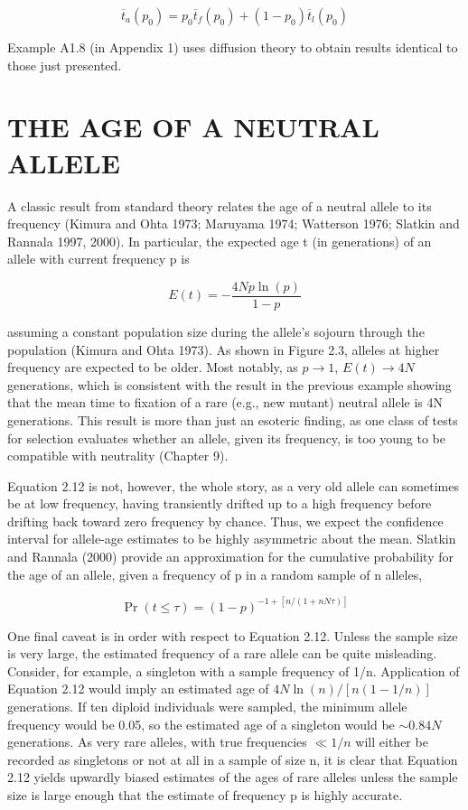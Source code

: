 \documentclass{article}
\begin{document}
\begin{equation}
\overline{t}_{a}(p_{0})=p_{0}\overline{t}_{f}(p_{0})+(1-p_{0})\overline{t}_{l}(p_{0})
\tag{2.11d}
\label{eq:2_11d}
\end{equation}

Example A1.8 (in Appendix 1) uses diffusion theory to obtain results identical to those just presented.

\section{THE AGE OF A NEUTRAL ALLELE}
A classic result from standard theory relates the age of a neutral allele to its frequency (Kimura and Ohta 1973; Maruyama 1974; Watterson 1976; Slatkin and Rannala 1997, 2000). In particular, the expected age t (in generations) of an allele with current frequency p is

\begin{equation}
E(t)=-\frac{4Np\ln(p)}{1-p}
\tag{2.12}
\label{eq:2_12}
\end{equation}

assuming a constant population size during the allele's sojourn through the population (Kimura and Ohta 1973). As shown in Figure 2.3, alleles at higher frequency are expected to be older. Most notably, as  $ p \rightarrow 1 $,  $ E(t) \rightarrow 4N $ generations, which is consistent with the result in the previous example showing that the mean time to fixation of a rare (e.g., new mutant) neutral allele is 4N generations. This result is more than just an esoteric finding, as one class of tests for selection evaluates whether an allele, given its frequency, is too young to be compatible with neutrality (Chapter 9).

Equation 2.12 is not, however, the whole story, as a very old allele can sometimes be at low frequency, having transiently drifted up to a high frequency before drifting back toward zero frequency by chance. Thus, we expect the confidence interval for allele-age estimates to be highly asymmetric about the mean. Slatkin and Rannala (2000) provide an approximation for the cumulative probability for the age of an allele, given a frequency of p in a random sample of n alleles,

\begin{equation}
\Pr(t\leq\tau)=(1-p)^{-1+[n/(1+nN\tau)]}
\tag{2.13}
\label{eq:2_13}
\end{equation}

One final caveat is in order with respect to Equation 2.12. Unless the sample size is very large, the estimated frequency of a rare allele can be quite misleading. Consider, for example, a singleton with a sample frequency of 1/n. Application of Equation 2.12 would imply an estimated age of  $ 4N \ln(n)/[n(1-1/n)] $ generations. If ten diploid individuals were sampled, the minimum allele frequency would be 0.05, so the estimated age of a singleton would be  $ \sim 0.84N $ generations. As very rare alleles, with true frequencies  $ \ll 1/n $ will either be recorded as singletons or not at all in a sample of size n, it is clear that Equation 2.12 yields upwardly biased estimates of the ages of rare alleles unless the sample size is large enough that the estimate of frequency p is highly accurate.
\end{document}
